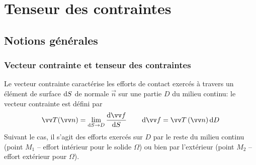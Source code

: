 \chapter{Tenseur des contraintes} \label{chap:Ch02}
\section{Notions générales} \label{sec:Ch02-1}
\subsection{Vecteur contrainte et tenseur des contraintes} \label{ssec:Ch02-1.1}
Le vecteur contrainte caractérise les efforts de contact exercés à travers un élément de surface $\mathop{\mathrm{{}d}}\mathopen{} S$ de normale $\vec{n}$ sur une partie $D$ du milieu continu: le vecteur contrainte est défini par
\begin{equation}
    \vec{T}(\vec{n}) = \lim_{\ud S \rightarrow D} \frac{\ud \vec{f}}{\ud S} \qquad \ud \vec{f} = \vec{T}\left( \vec{n} \right) \ud D
    \label{eq:Ch02-001}
\end{equation}
Suivant le cas, il s'agit des efforts exercés sur $D$ par le reste du milieu continu (point $M_1$ -- effort intérieur pour le solide $\Omega$) ou bien par l'extérieur (point $M_2$ -- effort extérieur pour $\Omega$).


